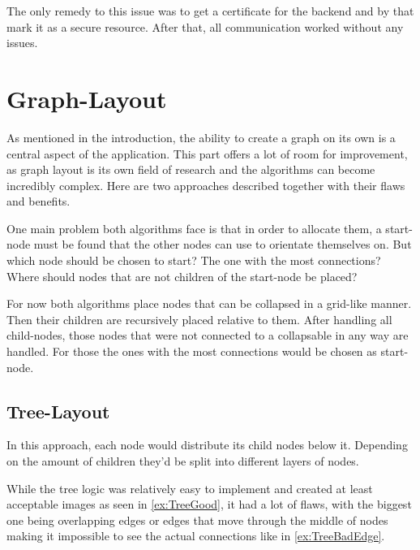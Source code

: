 The only remedy to this issue was to get a certificate for the backend and by that mark it as a secure resource. After that, all communication worked without any issues.

\newpage
\section{Graph-Layout}
As mentioned in the introduction, the ability to create a graph on its own is a central aspect of the application. This part offers a lot of room for improvement, as graph layout is its own field of research and the algorithms can become incredibly complex. Here are two approaches described together with their flaws and benefits.

One main problem both algorithms face is that in order to allocate them, a start-node must be found that the other nodes can use to orientate themselves on. But which node should be chosen to start? The one with the most connections? Where should nodes that are not children of the start-node be placed? 

For now both algorithms place nodes that can be collapsed in a grid-like manner. Then their children are recursively placed relative to them. After handling all child-nodes, those nodes that were not connected to a collapsable in any way are handled. For those the ones with the most connections would be chosen as start-node.

\subsection{Tree-Layout}
In this approach, each node would distribute its child nodes below it. Depending on the amount of children they'd be split into different layers of nodes.

While the tree logic was relatively easy to implement and created at least acceptable images as seen in \autoref{ex:TreeGood}, it had a lot of flaws, with the biggest one being overlapping edges or edges that move through the middle of nodes making it impossible to see the actual connections like in \autoref{ex:TreeBadEdge}.

